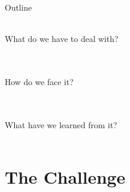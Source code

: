 \documentclass[utf8]{beamer}
\begin{document}
\begin{frame}[t]
{\begin{center}
		\end{center}
	}
\end{frame}

\begin{frame}{Outline}
	\begin{description}
		\item<+->[The Challenge] {\ \\ What do we have to deal with? \\ \ }
		\item<+->[The Plan] {\ \\ How do we face it? \\ \  }
		\item<+->[The Tips and Tricks] {\ \\ What have we learned from it? \\ \ }
	\end{description}
\end{frame}

\section{The Challenge}
\end{document}
